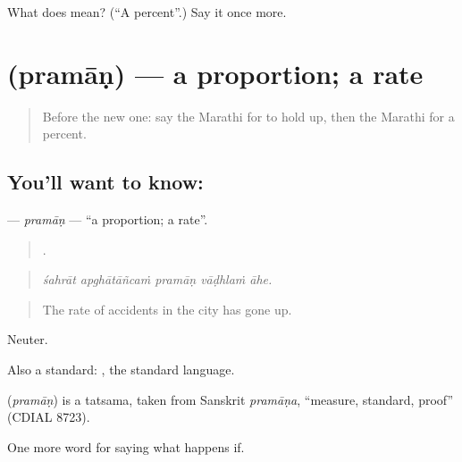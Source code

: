 \begin{tcolorbox}[breakable,colback=teal!4,colframe=teal!35!black,title={Before you move on}]
What does  mean? (\textquotedblleft{}A percent\textquotedblright{}.) Say it once more.
\end{tcolorbox}
\section[\texorpdfstring{\mr{प्रमाण} (pramāṇ)}{प्रमाण (pramāṇ)}]{ (pramāṇ) — a proportion; a rate}

\label{lesson:MR-C391-praman}



\begin{quote}
Before the new one: say the Marathi for to hold up, then the Marathi for a percent.
\end{quote}

\subsection*{You'll want to know: }
\textbf{} — \emph{pramāṇ} — \textquotedblleft{}a proportion; a rate\textquotedblright{}.

\begin{quote}
    .
\end{quote}

\begin{quote}
\emph{śahrāt apghātāñcaṁ pramāṇ vāḍhlaṁ āhe.}
\end{quote}

\begin{quote}
The rate of accidents in the city has gone up.
\end{quote}

Neuter.

Also a standard: , the standard language.

\begin{cousinweb}
\textbf{} (\emph{pramāṇ}) is a tatsama, taken from Sanskrit \emph{pramāṇa}, \textquotedblleft{}measure, standard, proof\textquotedblright{} (CDIAL 8723).
\end{cousinweb}

\begin{grammarlens}[title={What you've built}]
One more word for saying what happens if.
\end{grammarlens}

